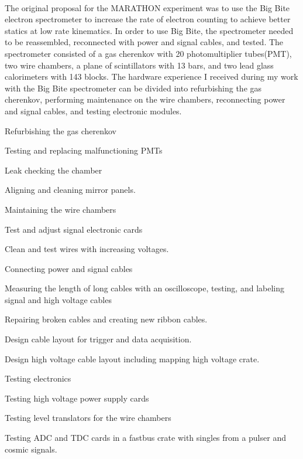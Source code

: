 \documentclass[12pt,letterpaper]{article}
\begin{document}
\paragraph{}The original proposal for the MARATHON experiment was to use the Big Bite electron spectrometer to increase the rate of electron counting to achieve better statics at low rate kinematics. In order to use Big Bite, the spectrometer needed to be reassembled, reconnected with power and signal cables, and tested. The spectrometer consisted of a gas cherenkov with 20 photomultiplier tubes(PMT), two wire chambers, a plane of scintillators with 13 bars, and two lead glass calorimeters with 143 blocks. The hardware experience I received during my work with the Big Bite spectrometer can be divided into refurbishing the gas cherenkov, performing maintenance on the wire chambers, reconnecting power and signal cables, and testing electronic modules.
\begin{itemize*}
	\item Refurbishing the gas cherenkov
	\begin{itemize*}
		\item Testing and replacing malfunctioning PMTs
		\item Leak checking the chamber
		\item Aligning and cleaning mirror panels.
	\end{itemize*}
	\item Maintaining the wire chambers
	\begin{itemize*}
		\item Test and adjust signal electronic cards
		\item Clean and test wires with increasing voltages. 
	\end{itemize*}
	\item Connecting power and signal cables
	\begin{itemize*}
		\item Measuring the length of long cables with an oscilloscope, testing, and labeling signal and high voltage cables
		\item Repairing broken cables and creating new ribbon cables. 
		\item Design cable layout for trigger and data acquisition.
		\item Design high voltage cable layout including mapping high voltage crate.
	\end{itemize*}
	\item Testing electronics
	\begin{itemize*}
		\item Testing high voltage power supply cards
		\item Testing level translators for the wire chambers
		\item Testing ADC and TDC cards in a fastbus crate with singles from a pulser and cosmic signals. 
	\end{itemize*}
\end{itemize*}
\end{document}
